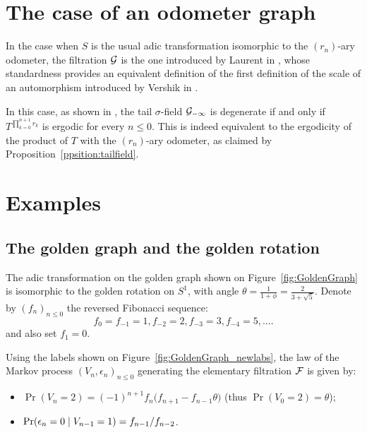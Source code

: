 \documentclass[12pt,a4paper]{article}
\begin{document}
\section{The case of an odometer graph}

In the case when $S$ is the usual adic transformation isomorphic to 
the $(r_n)$-ary odometer, 
the filtration $\mathcal{G}$ is the one introduced by Laurent in \cite{LauXLV}, 
whose standardness provides an equivalent definition of the first 
definition of the scale of an automorphism introduced by Vershik in \cite{thescale}. 

In this case, as shown in \cite{LauXLV}, the tail $\sigma$-field $\mathcal{G}_{-\infty}$ 
is degenerate if and only if $T^{\prod_{k=0}^{n+1}r_k}$ is ergodic for every $n \leq 0$. 
This is indeed equivalent to the ergodicity of the product of $T$ 
with the $(r_n)$-ary odometer, as claimed by Proposition~\ref{ppsition:tailfield}.

\section{Examples}
 


\subsection{The golden graph and the golden rotation}

The adic transformation on the golden graph shown on Figure~\ref{fig:GoldenGraph} 
is isomorphic to the golden rotation on $S^1$, 
with angle $\theta=\frac{1}{1+\phi}=\frac{2}{3+\sqrt{5}}$. 
Denote by 
\({(f_n)}_{n \leq 0}\) the reversed Fibonacci sequence: 
\[
  f_0=f_{-1}=1, f_{-2}=2, f_{-3}=3, f_{-4}=5, \ldots.
\]
and also set $f_1=0$. 

Using the labels shown on Figure~\ref{fig:GoldenGraph_newlabs}, 
the law of the Markov process 
${(V_n, \epsilon_n)}_{n \leq 0}$ generating the elementary filtration $\mathcal{F}$ 
is given by:
\begin{itemize}
\item $\Pr(V_n = 2) =  {(-1)}^{n+1} f_n\bigl(f_{n+1} - f_{n-1} \theta\bigr)$ 
(thus $\Pr(V_0=2)=\theta$);

\item $\Pr(\epsilon_n=0 \mid V_{n-1}=1) = f_{n-1}/f_{n-2}$. 
\end{itemize}
\end{document}
